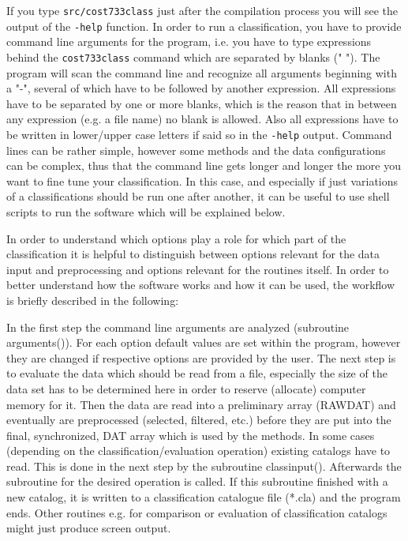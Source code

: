 \documentclass[12pt, oneside, a4paper, headsepline, plainheadsepline]{scrbook}
\begin{document}
If you type \verb+src/cost733class+ just after the compilation process you will see the output of the \verb+-help+ function.
In order to run a classification, you have to provide command line arguments for the program, i.e. you have to
type expressions behind the \verb+cost733class+ command which are separated by blanks (" "). The program will scan
the command line and recognize all arguments beginning with a "-", several of which have to be followed by another expression.
All expressions have to be separated by one or more blanks, which is the reason that in between any expression (e.g. a file name) no blank is
allowed. Also all expressions have to be written in lower/upper case letters if said so in the \verb+-help+ output. 
Command lines can be rather simple, however some methods and the data configurations can be complex, 
thus that the command line gets longer and longer the more you want to fine tune your classification. 
In this case, and especially if just variations of a classifications should be run one after another, it can be useful to use shell 
scripts to run the software which will be explained below.

In order to understand which options play a role for which part of the classification it is helpful to distinguish between
options relevant for the data input and preprocessing and options relevant for the routines itself. 
In order to better understand how the software works and how it can be used, the workflow is briefly described in the following:

In the first step the command line arguments are analyzed (subroutine arguments()). For each option default values are set
within the program, however they are changed if respective options are provided by the user. 
The next step is to evaluate the data which should be read from a file, especially the size of the data set has to be determined here
in order to reserve (allocate) computer memory for it. Then the data are read into a preliminary array (RAWDAT) and eventually 
are preprocessed (selected, filtered, etc.) before they are put into the final, synchronized, DAT array which is used by the methods. In some cases 
(depending on the classification/evaluation operation) existing catalogs have to read. This is done in the next step by the subroutine classinput().
Afterwards the subroutine for the desired operation is called. If this subroutine finished with a new catalog, it is written to a classification
 catalogue file (*.cla) and the program ends. Other routines e.g. for comparison or evaluation of classification catalogs might just produce screen 
 output.
\end{document}
